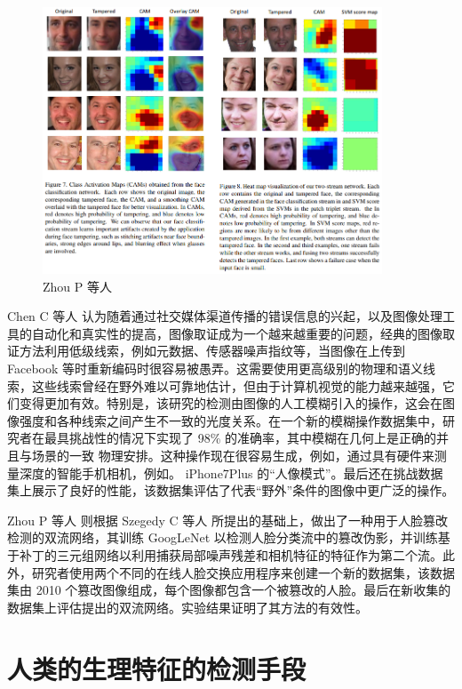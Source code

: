 \begin{figure}[htb]
\centering 
\includegraphics[width=0.90\textwidth]{img/ch3m6.png} 
\caption{Zhou P 等人 \cite{zhou2017two}}
\label{Test}
\end{figure}

Chen C 等人 \cite{chen2018focus} 认为随着通过社交媒体渠道传播的错误信息的兴起，以及图像处理工具的自动化和真实性的提高，图像取证成为一个越来越重要的问题，经典的图像取证方法利用低级线索，例如元数据、传感器噪声指纹等，当图像在上传到 Facebook 等时重新编码时很容易被愚弄。这需要使用更高级别的物理和语义线索，这些线索曾经在野外难以可靠地估计，但由于计算机视觉的能力越来越强，它们变得更加有效。特别是，该研究的检测由图像的人工模糊引入的操作，这会在图像强度和各种线索之间产生不一致的光度关系。在一个新的模糊操作数据集中，研究者在最具挑战性的情况下实现了 98\% 的准确率，其中模糊在几何上是正确的并且与场景的一致 物理安排。这种操作现在很容易生成，例如，通过具有硬件来测量深度的智能手机相机，例如。 iPhone7Plus 的“人像模式”。最后还在挑战数据集上展示了良好的性能，该数据集评估了代表“野外”条件的图像中更广泛的操作。

Zhou P 等人 \cite{zhou2017two} 则根据 Szegedy C 等人 \cite{szegedy2015going}所提出的基础上，做出了一种用于人脸篡改检测的双流网络，其训练 GoogLeNet 以检测人脸分类流中的篡改伪影，并训练基于补丁的三元组网络以利用捕获局部噪声残差和相机特征的特征作为第二个流。此外，研究者使用两个不同的在线人脸交换应用程序来创建一个新的数据集，该数据集由 2010 个篡改图像组成，每个图像都包含一个被篡改的人脸。最后在新收集的数据集上评估提出的双流网络。实验结果证明了其方法的有效性。

\section{人类的生理特征的检测手段}

